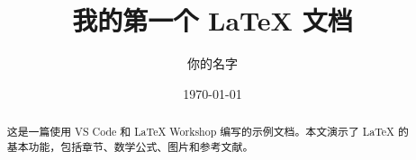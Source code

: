 \documentclass[12pt,a4paper,UTF8]{ctexart} %
\title{我的第一个 LaTeX 文档}
\author{你的名字}
\date{\today}
\begin{document}
\maketitle

\begin{abstract}
这是一篇使用 VS Code 和 LaTeX Workshop 编写的示例文档。本文演示了 LaTeX 的基本功能，包括章节、数学公式、图片和参考文献。
\end{abstract}

\tableofcontents
\newpage







\clearpage                  %
\sloppy                     %


\vspace{1em}                %
\fussy                      %
\end{document}
